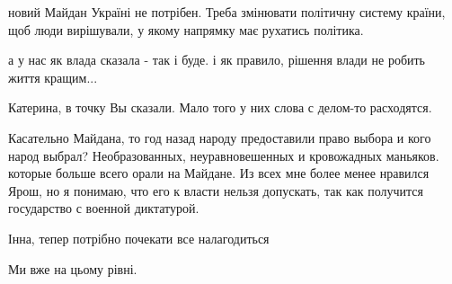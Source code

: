 \begin{itemize}

новий Майдан Україні не потрібен. Треба змінювати політичну систему країни, щоб
люди вирішували, у якому напрямку має рухатись політика.

а у нас як влада сказала - так і буде. і як правило, рішення влади не робить життя кращим...

Катерина, в точку Вы сказали. Мало того у них слова с делом-то расходятся.


Касательно Майдана, то год назад народу предоставили право выбора и кого народ
выбрал? Необразованных, неуравновешенных и кровожадных маньяков. которые больше
всего орали на Майдане. Из всех мне более менее нравился Ярош, но я понимаю, что
его к власти нельзя допускать, так как получится государство с военной
диктатурой.

Інна, тепер потрібно почекати все налагодиться

Ми вже на цьому рівні.

\end{itemize} %
